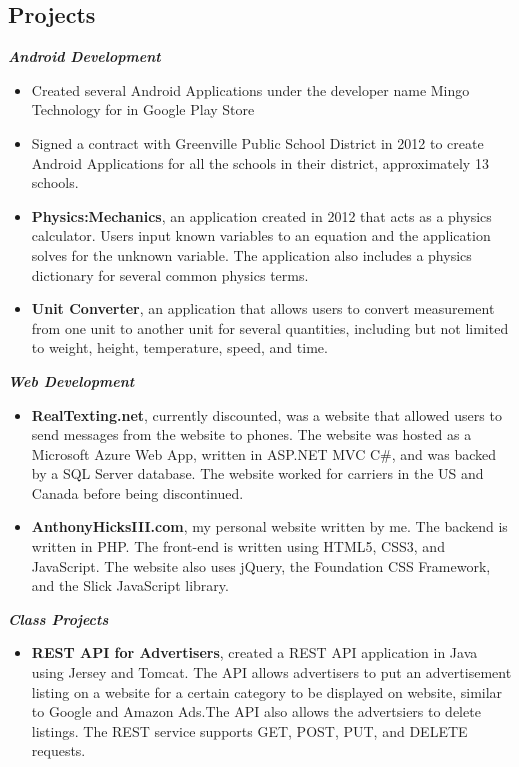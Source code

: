 \documentclass[10pt]{res}
\begin{document}
\begin{resume}
\section{Projects}
\textbf{\textit{Android Development}}
	\vspace*{.25em}
	\begin{itemize}
		\item Created several Android Applications under the developer name Mingo Technology for in Google Play Store
		\item Signed a contract with Greenville Public School District in 2012 to create Android Applications for all the schools in their district, approximately 13 schools. 
		\item \textbf{Physics:Mechanics}, an application created in 2012 that acts as a physics calculator. Users input known variables to an equation and the application solves for the unknown variable. The application also includes a physics dictionary for several common physics terms. 
		\item \textbf{Unit Converter}, an application that allows users to convert measurement from one unit to another unit for several quantities, including but not limited to weight, height, temperature, speed, and time. 
	\end{itemize} 
\textbf{\textit{Web Development}}
	\vspace*{.25em}
	\begin{itemize}
		\item \textbf{RealTexting.net}, currently discounted, was a website that allowed users to send messages from the website to phones. The website was hosted as a Microsoft Azure Web App, written in ASP.NET MVC C\#, and was backed by a SQL Server database. The website worked for carriers in the US and Canada before being discontinued. 
		\item \textbf{AnthonyHicksIII.com}, my personal website written by me. The backend is written in PHP. The front-end is written using HTML5, CSS3, and JavaScript. The website also uses jQuery, the Foundation CSS Framework, and the Slick JavaScript library.
	\end{itemize}
\textbf{\textit{Class Projects}}
	\vspace*{.25em}
	\begin{itemize}
		\item \textbf{REST API for Advertisers}, created a REST API application in Java using Jersey and Tomcat. The API allows advertisers to put an advertisement listing on a website for a certain category to be displayed on website, similar to Google and Amazon Ads.The API also allows the advertsiers to delete listings. The REST service supports GET, POST, PUT, and DELETE requests.  
	\end{itemize} 


\end{resume}
\end{document}
